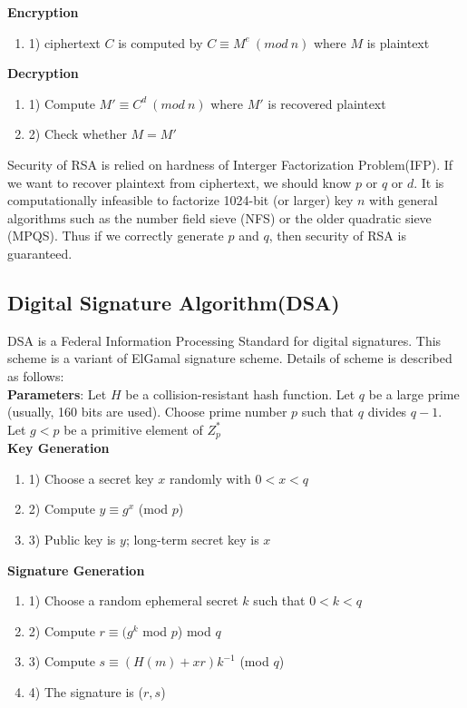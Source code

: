 \documentclass[a4paper]{article}
\begin{document}
\textbf{Encryption}
\begin{enumerate}[label=]
      \item 1) ciphertext $C$ is computed by  $C \equiv M^e \ (mod \ n)$ where $M$ is plaintext
\end{enumerate} 

\textbf{Decryption}
\begin{enumerate}[label=]
      \item 1) Compute $M' \equiv C^d \ (mod \ n)$ where $M'$ is recovered plaintext
      \item 2) Check whether $M=M'$
\end{enumerate} 

Security of RSA is relied on hardness of Interger Factorization Problem(IFP). If we want to recover plaintext from ciphertext, we should know $p$ or $q$ or $d$. It is computationally infeasible to factorize 1024-bit (or larger) key $n$ with general algorithms such as the number field sieve (NFS) or the older quadratic sieve (MPQS). Thus if we correctly generate $p$ and $q$, then security of RSA is guaranteed.

\subsection{Digital Signature Algorithm(DSA)}
DSA is a Federal Information Processing Standard for digital signatures. This scheme is a variant of ElGamal signature scheme. Details of scheme is described as follows:
\\

\textbf{Parameters}: Let $H$ be a collision-resistant hash function. Let $q$ be a large prime (usually, 160 bits are used). Choose prime number $p$ such that $q$ divides $q-1$. Let $g<p$ be a primitive element of $Z_p^*$
\\

\textbf{Key Generation}
\begin{enumerate}[label=]
      \item 1) Choose a secret key $x$ randomly with $0<x<q$
      
      \item 2) Compute $y \equiv g^x$ (mod $p$)
      
      \item 3) Public key is $y$; long-term secret key is $x$
\end{enumerate}

\textbf{Signature Generation}
\begin{enumerate}[label=]
      \item 1) Choose a random ephemeral secret $k$ such that $0<k<q$
      
      \item 2) Compute $r \equiv (g^k$ mod $p$) mod $q$
      
      \item 3) Compute $s \equiv (H(m)+xr)k^{-1}$ (mod $q$)
      
      \item 4) The signature is ($r,s$)
\end{enumerate} 
\end{document}
